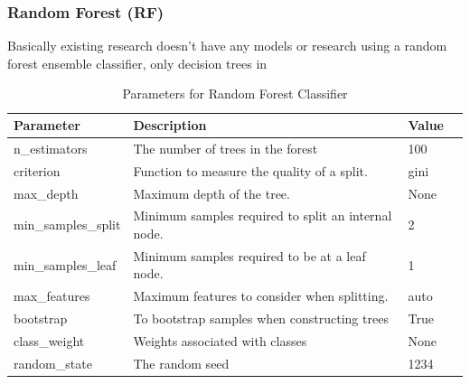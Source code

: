 
\subsubsection{Random Forest (RF)}
\label{sec:RF}

Basically existing research doesn't have any models or research using a random forest ensemble classifier, only decision trees in \parencite{9360747}

\begin{table}[h]
\centering
\caption{Parameters for Random Forest Classifier}
\label{tab:rf-params}
\begin{tabular}{|l|l|l|l|}
\hline
\textbf{Parameter} & \textbf{Description} & \textbf{Value}  \\ \hline
n\_estimators & The number of trees in the forest & 100\\
criterion & Function to measure the quality of a split. & gini\\
max\_depth & Maximum depth of the tree. &  None \\
min\_samples\_split & Minimum samples required to split an internal node. & 2 \\ 
min\_samples\_leaf & Minimum samples required to be at a leaf node. & 1 \\
max\_features & Maximum features to consider when splitting.  & auto \\
bootstrap & To bootstrap samples when constructing trees & True \\
class\_weight & Weights associated with classes & None  \\
random\_state & The random seed & 1234 \\ \hline
\end{tabular}
\end{table}


